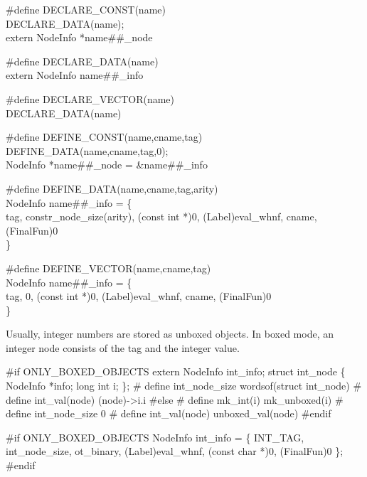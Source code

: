 \nwenddocs{}\plusendmoddef\nwstartdeflinemarkup{}\nwenddeflinemarkup
#define DECLARE_CONST(name) \\
DECLARE_DATA(name); \\
extern NodeInfo *name##_node

#define DECLARE_DATA(name) \\
extern NodeInfo name##_info

#define DECLARE_VECTOR(name) \\
DECLARE_DATA(name)

#define DEFINE_CONST(name,cname,tag) \\
DEFINE_DATA(name,cname,tag,0); \\
NodeInfo *name##_node = &name##_info

#define DEFINE_DATA(name,cname,tag,arity) \\
NodeInfo name##_info = \{ \\
    tag, constr_node_size(arity), (const int *)0, (Label)eval_whnf, cname, \\
    (FinalFun)0 \\
\}

#define DEFINE_VECTOR(name,cname,tag) \\
NodeInfo name##_info = \{ \\
    tag, 0, (const int *)0, (Label)eval_whnf, cname, (FinalFun)0 \\
\}

\nwendcode{}\nwdocspar
Usually, integer numbers are stored as unboxed objects. In boxed mode,
an integer node consists of the tag and the integer value.

\nwenddocs{}\plusendmoddef\nwstartdeflinemarkup{}\nwenddeflinemarkup
#if ONLY_BOXED_OBJECTS
extern NodeInfo int_info;
struct int_node \{
    NodeInfo *info;
    long int i;
\};
# define int_node_size          wordsof(struct int_node)
# define int_val(node)          (node)->i.i
#else
# define mk_int(i)              mk_unboxed(i)
# define int_node_size          0
# define int_val(node)          unboxed_val(node)
#endif

\nwendcode{}\nwdocspar
\nwenddocs{}\plusendmoddef\nwstartdeflinemarkup{}\nwenddeflinemarkup
#if ONLY_BOXED_OBJECTS
NodeInfo int_info = \{ 
    INT_TAG, int_node_size, ot_binary, (Label)eval_whnf, (const char *)0, (FinalFun)0
\};
#endif

